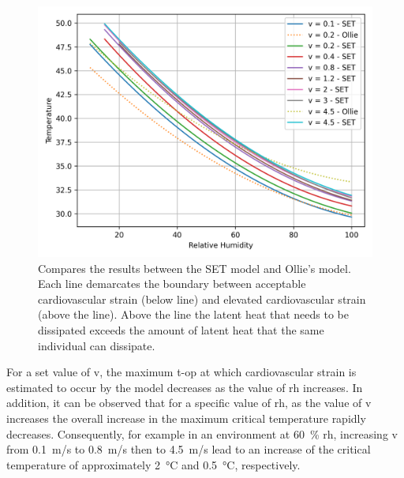 


\begin{figure}
    \centering
    \includegraphics[width=\textwidth]{figures/comparison_air_speed.png}
    \caption{Compares the results between the SET model and Ollie's model.
    Each line demarcates the boundary between acceptable cardiovascular strain (below line) and elevated cardiovascular strain (above the line).
    Above the line the latent heat that needs to be dissipated exceeds the amount of latent heat that the same individual can dissipate. }
    \label{fig:comparison_air_speed}
\end{figure}

For a set value of \ac{v}, the maximum \ac{t-op} at which cardiovascular strain is estimated to occur by the model decreases as the value of \ac{rh} increases.
In addition, it can be observed that for a specific value of \ac{rh}, as the value of \ac{v} increases the overall increase in the maximum critical temperature rapidly decreases.
Consequently, for example in an environment at 60~\% \ac{rh}, increasing \ac{v} from 0.1~m/s to 0.8~m/s then to 4.5~m/s lead to an increase of the critical temperature of approximately 2~°C and 0.5~°C, respectively.

